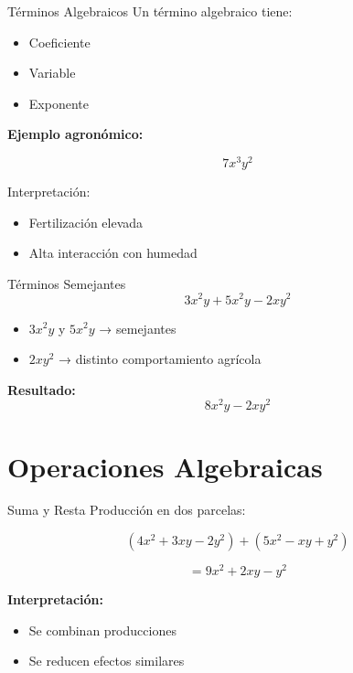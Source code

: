 \documentclass[aspectratio=169,12pt]{beamer}
\begin{document}
	\begin{frame}{Términos Algebraicos}
		Un término algebraico tiene:
		
		\pause
		
		\begin{itemize}
			\item Coeficiente
			\item Variable
			\item Exponente
		\end{itemize}
		
		\pause
		
		\textbf{Ejemplo agronómico:}
		
		\[
		7x^3y^2
		\]
		
		\pause
		
		Interpretación:
		\begin{itemize}
			\item Fertilización elevada
			\item Alta interacción con humedad
		\end{itemize}
		
	\end{frame}
	
	\begin{frame}{Términos Semejantes}
		\[
		3x^2y + 5x^2y - 2xy^2
		\]
		
		\pause
		
		\begin{itemize}
			\item $3x^2y$ y $5x^2y$ → semejantes
			\item $2xy^2$ → distinto comportamiento agrícola
		\end{itemize}
		
		\pause
		
		\textbf{Resultado:}
		\[
		8x^2y - 2xy^2
		\]
		
	\end{frame}
	
	\section{Operaciones Algebraicas}
	
	\begin{frame}{Suma y Resta}
		Producción en dos parcelas:
		
		\[
		(4x^2 + 3xy - 2y^2) + (5x^2 - xy + y^2)
		\]
		
		\pause
		
		\[
		= 9x^2 + 2xy - y^2
		\]
		
		\pause
		
		\textbf{Interpretación:}
		\begin{itemize}
			\item Se combinan producciones
			\item Se reducen efectos similares
		\end{itemize}
		
	\end{frame}
	
\end{document}
